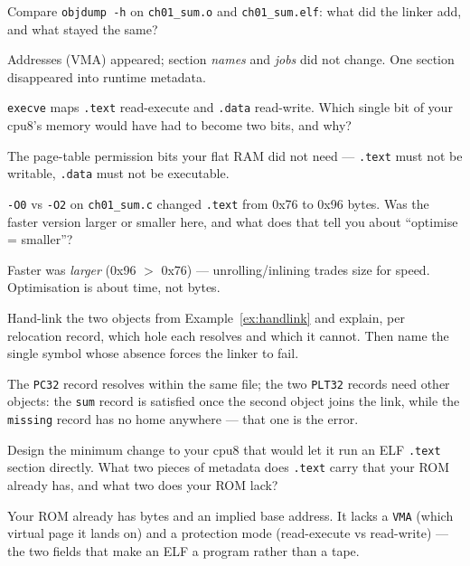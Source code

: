 \begin{exercise}\label{ex:med02}
Compare \texttt{objdump -h} on \texttt{ch01\_sum.o} and
\texttt{ch01\_sum.elf}: what did the linker add, and what stayed
the same?
\end{exercise}
\begin{solution}[hint]
Addresses (VMA) appeared; section \emph{names} and \emph{jobs} did not
change. One section disappeared into runtime metadata.
\end{solution}

\begin{exercise}\label{ex:med03}
\texttt{execve} maps \texttt{.text} read-execute and \texttt{.data}
read-write. Which single bit of your cpu8's memory would have had to
become two bits, and why?
\end{exercise}
\begin{solution}[hint]
The page-table permission bits your flat RAM did not need ---
\texttt{.text} must not be writable, \texttt{.data} must not be
executable.
\end{solution}

\begin{exercise}\label{ex:med04}
\texttt{-O0} vs \texttt{-O2} on \texttt{ch01\_sum.c} changed
\texttt{.text} from 0x76 to 0x96 bytes. Was the faster version larger
or smaller here, and what does that tell you about ``optimise =
smaller''?
\end{exercise}
\begin{solution}[hint]
Faster was \emph{larger} (0x96 $>$ 0x76) --- unrolling/inlining trades
size for speed. Optimisation is about time, not bytes.
\end{solution}

\begin{exercise}[hard]\label{ex:hard01}
Hand-link the two objects from
Example~\ref{ex:handlink} and explain, per relocation record, which
hole each resolves and which it cannot. Then name the single symbol
whose absence forces the linker to fail.
\end{exercise}
\begin{solution}[hint]
The \texttt{PC32} record resolves within the same file; the two
\texttt{PLT32} records need other objects: the \texttt{sum} record is
satisfied once the second object joins the link, while the
\texttt{missing} record has no home anywhere --- that one is the error.
\end{solution}

\begin{exercise}[hard]\label{ex:hard02}
Design the minimum change to your cpu8 that would let it run an ELF
\texttt{.text} section directly. What two pieces of metadata does
\texttt{.text} carry that your ROM already has, and what two does
your ROM lack?
\end{exercise}
\begin{solution}[hint]
Your ROM already has bytes and an implied base address. It lacks a
\texttt{VMA} (which virtual page it lands on) and a protection mode
(read-execute vs read-write) --- the two fields that make an ELF a
program rather than a tape.
\end{solution}

